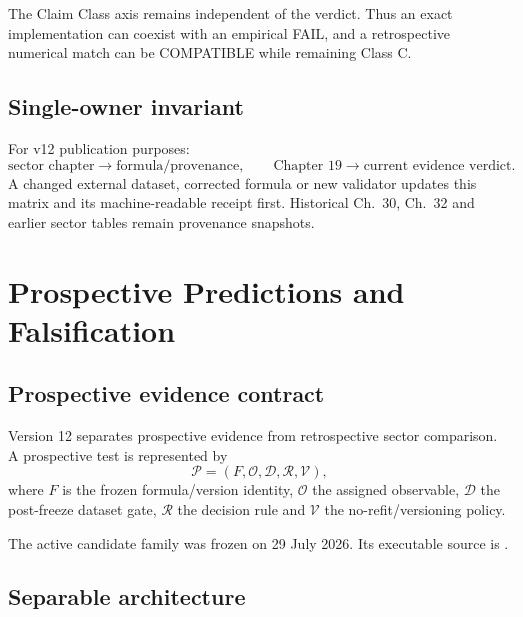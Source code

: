 The Claim Class axis remains independent of the verdict. Thus an exact implementation can coexist with an empirical FAIL, and a retrospective numerical match can be COMPATIBLE while remaining Class C.

\section{Single-owner invariant}

For v12 publication purposes:
\[
\boxed{
\text{sector chapter}\to\text{formula/provenance},
\qquad
\text{Chapter 19}\to\text{current evidence verdict}.
}
\]
A changed external dataset, corrected formula or new validator updates this matrix and its machine-readable receipt first. Historical Ch.~30, Ch.~32 and earlier sector tables remain provenance snapshots.

\clearpage

\chapter{Prospective Predictions and Falsification}
\label{ch:v12_predictions_falsification}

\section{Prospective evidence contract}

Version 12 separates prospective evidence from retrospective sector comparison. A prospective test is represented by
\begin{equation}
\boxed{
\mathcal P
=(F,\mathcal O,\mathcal D,\mathcal R,\mathcal V),
}
\end{equation}
where $F$ is the frozen formula/version identity, $\mathcal O$ the assigned observable, $\mathcal D$ the post-freeze dataset gate, $\mathcal R$ the decision rule and $\mathcal V$ the no-refit/versioning policy.

The active candidate family was frozen on 29 July 2026. Its executable source is
.

\section{Separable architecture}

